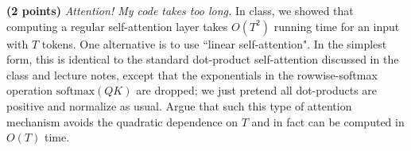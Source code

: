 \noindent {} 
\textbf{(2 points)} \textit{Attention! My code takes too long.} In class, we showed that computing a regular self-attention layer takes $O(T^2)$ running time for an input with $T$ tokens. One alternative is to use ``linear self-attention". In the simplest form, this is identical to the standard dot-product self-attention discussed in the class and lecture notes, except that the exponentials in the rowwise-softmax operation
$\mathrm{softmax}(QK)$ are dropped; we just pretend all dot-products are positive and normalize as usual. Argue that such this type of attention mechanism avoids the quadratic dependence on $T$ and in fact can be computed in $O(T)$ time. \\
